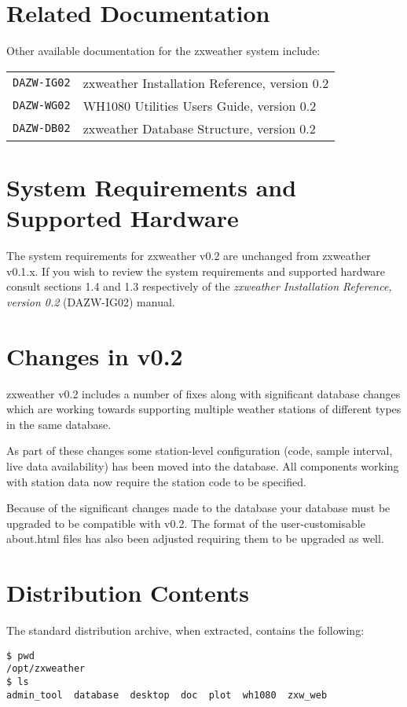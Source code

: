 \documentclass[a4paper,10pt,draft]{book}
\begin{document}
\section{Related Documentation}
Other available documentation for the zxweather system include:

\begin{tabular}{l l}
\verb|DAZW-IG02| & zxweather Installation Reference, version 0.2\\
\verb|DAZW-WG02| & WH1080 Utilities Users Guide, version 0.2 \\
\verb|DAZW-DB02| & zxweather Database Structure, version 0.2 \\
\end{tabular}

\section{System Requirements and Supported Hardware}
The system requirements for zxweather v0.2 are unchanged from zxweather v0.1.x. If you wish to review the system requirements and supported hardware consult sections 1.4 and 1.3 respectively of the \emph{zxweather Installation Reference, version 0.2} (DAZW-IG02) manual.

\section{Changes in v0.2}
zxweather v0.2 includes a number of fixes along with significant database changes which are working towards supporting multiple weather stations of different types in the same database.

As part of these changes some station-level configuration (code, sample interval, live data availability) has been moved into the database. All components working with station data now require the station code to be specified.

Because of the significant changes made to the database your database must be upgraded to be compatible with v0.2. The format of the user-customisable about.html files has also been adjusted requiring them to be upgraded as well.

\section{Distribution Contents}
The standard distribution archive, when extracted, contains the following:

\begin{verbatim}
$ pwd
/opt/zxweather
$ ls
admin_tool  database  desktop  doc  plot  wh1080  zxw_web
\end{verbatim}
\end{document}
